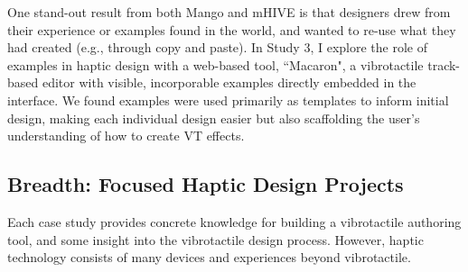 One stand-out result from both Mango and mHIVE is that designers drew from their experience or examples found in the world, and wanted to re-use what they had created (e.g., through copy and paste).
In Study 3, I explore the role of examples in haptic design with a web-based tool, ``Macaron", a vibrotactile track-based editor with visible, incorporable examples directly embedded in the interface.
We found examples were used primarily as templates to inform initial design, making each individual design easier but also scaffolding the user's understanding of how to create VT effects.

\subsection{Breadth: Focused Haptic Design Projects}
Each case study provides concrete knowledge for building a vibrotactile authoring tool, and some insight into the vibrotactile design process.
However, haptic technology consists of many devices and experiences beyond vibrotactile.

